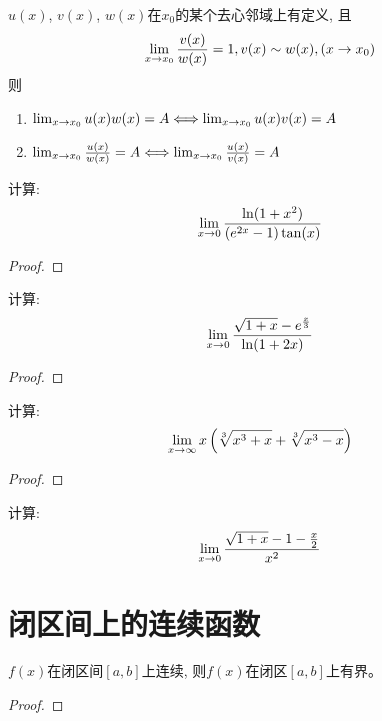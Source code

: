 \begin{theorem}
    $u(x)$, $v(x)$, $w(x)$在$x_0$的某个去心邻域上有定义, 且
    \[ \lim_{x \to x_0 } \frac{v(x)}{w(x)} = 1, v(x) \sim w(x), (x \to x_0)\]
    则
    \begin{enumerate}
        \item $\lim_{x \to x_0 } u(x)w(x) = A \Longleftrightarrow \lim_{x \to x_0 } u(x)v(x) = A$
        \item $\lim_{x \to x_0 } \frac{u(x)}{w(x)} = A \Longleftrightarrow \lim_{x \to x_0 } \frac{u(x)}{v(x)} = A$
    \end{enumerate}
\end{theorem}

\begin{proposition}
    计算:
    \[ \lim_{x \to 0 } \frac{\ln(1+x^2)}{\left(e^{2x}-1\right)\tan(x)}\]
\end{proposition}
\begin{proof}
    
\end{proof}

\begin{proposition}
    计算:
    \[ \lim_{x \to 0 } \frac{\sqrt{1+x}-e^{\frac{x}{3}}}{\ln(1+2x)}\]
\end{proposition}
\begin{proof}
    
\end{proof}

\begin{proposition}
    计算:
    \[ \lim_{x \to \infty } x\left(\sqrt[3]{x^3+x}+\sqrt[3]{x^3-x}\right)\]
\end{proposition}
\begin{proof}
    
\end{proof}

\begin{proposition}
    计算:
    \[ \lim_{x \to 0 } \frac{\sqrt{1+x}-1-\frac{x}{2}}{x^2} \]
\end{proposition}

\section{闭区间上的连续函数}
\begin{theorem}[有界性定理]
    $f(x)$在闭区间$[a, b]$上连续, 则$f(x)$在闭区$[a, b]$上有界。
\end{theorem}
\begin{proof}
    
\end{proof}

